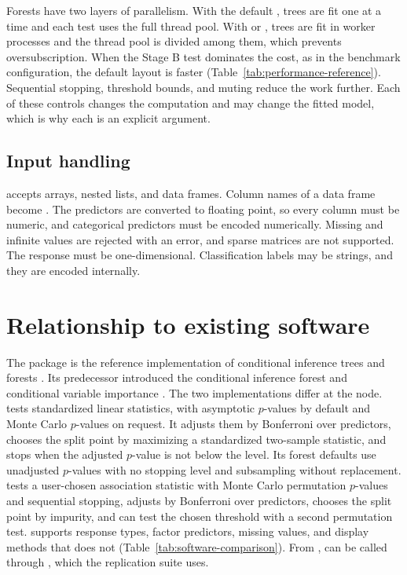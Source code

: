 \documentclass[article]{jss}
\newcommand{\citrees}{\pkg{citrees}\xspace}
\begin{document}
Forests have two layers of parallelism. With the default ,
trees are fit one at a time and each test uses the full thread pool. With
 or , trees are fit in  worker
processes \citep{joblib} and the thread pool is divided among them, which
prevents oversubscription. When the Stage B test dominates the cost, as in the
benchmark configuration, the default layout is faster
(Table~\ref{tab:performance-reference}). Sequential stopping, threshold
bounds, and muting reduce the work further. Each of these controls changes the
computation and may change the fitted model, which is why each is an explicit
argument.

\subsection{Input handling} \label{sec:input}

 accepts  arrays, nested lists, and  data
frames. Column names of a data frame become . The
predictors are converted to floating point, so every column must be numeric,
and categorical predictors must be encoded numerically. Missing and infinite
values are rejected with an error, and sparse matrices are not supported. The
response must be one-dimensional. Classification labels may be strings, and
they are encoded internally.

\section{Relationship to existing software} \label{sec:comparison}

The  package  is the reference implementation of
conditional inference trees and forests
\citep{Hothorn+Hornik+Zeileis:2006,Hothorn+Zeileis:2015}. Its predecessor
 introduced the conditional inference forest and conditional
variable importance
\citep{Hothorn+Hornik+Strobl+Zeileis:party,Strobl+Boulesteix+Kneib+Augustin+Zeileis:2008}.
The two implementations differ at the node.  tests standardized
linear statistics, with asymptotic $p$-values by default and Monte Carlo
$p$-values on request. It adjusts them by Bonferroni over predictors, chooses
the split point by maximizing a standardized two-sample statistic, and stops
when the adjusted $p$-value is not below the level. Its forest defaults use
unadjusted $p$-values with no stopping level and subsampling without
replacement. \citrees tests a user-chosen association statistic with Monte
Carlo permutation $p$-values and sequential stopping, adjusts by Bonferroni
over predictors, chooses the split point by impurity, and can test the chosen
threshold with a second permutation test.  supports response
types, factor predictors, missing values, and display methods that \citrees
does not (Table~\ref{tab:software-comparison}). From ,
 can be called through  \citep{Gautier:rpy2}, which
the replication suite uses.
\end{document}
